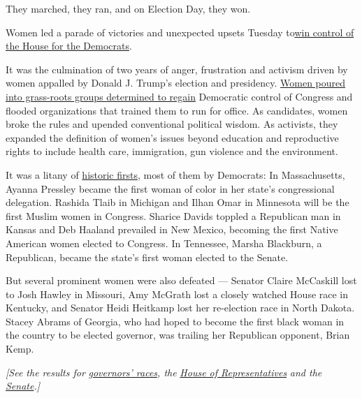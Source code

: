 They marched, they ran, and on Election Day, they won.

Women led a parade of victories and unexpected upsets Tuesday
to\href{https://www.nytimes.com/2018/11/06/us/politics/midterm-elections-results.html}{win
control of the House for the Democrats}.

It was the culmination of two years of anger, frustration and activism
driven by women appalled by Donald J. Trump's election and presidency.
\href{https://www.nytimes.com/2018/11/03/us/politics/women-activism-midterms.html?fbclid=IwAR0HEkwChpr-ouNizi4LoqrMMQC5n5AA1dzZI5uG0Lw8zyTN2DEAMW14wYw}{Women
poured into grass-roots groups determined to regain} Democratic control
of Congress and flooded organizations that trained them to run for
office. As candidates, women broke the rules and upended conventional
political wisdom. As activists, they expanded the definition of women's
issues beyond education and reproductive rights to include health care,
immigration, gun violence and the environment.

It was a litany of
\href{https://www.nytimes.com/2018/11/07/us/politics/election-history-firsts-blackburn-pressley.html}{historic
firsts}, most of them by Democrats: In Massachusetts, Ayanna Pressley
became the first woman of color in her state's congressional delegation.
Rashida Tlaib in Michigan and Ilhan Omar in Minnesota will be the first
Muslim women in Congress. Sharice Davids toppled a Republican man in
Kansas and Deb Haaland prevailed in New Mexico, becoming the first
Native American women elected to Congress. In Tennessee, Marsha
Blackburn, a Republican, became the state's first woman elected to the
Senate.

But several prominent women were also defeated --- Senator Claire
McCaskill lost to Josh Hawley in Missouri, Amy McGrath lost a closely
watched House race in Kentucky, and Senator Heidi Heitkamp lost her
re-election race in North Dakota. Stacey Abrams of Georgia, who had
hoped to become the first black woman in the country to be elected
governor, was trailing her Republican opponent, Brian Kemp.

\emph{{[}See the results for}
\emph{\href{https://www.nytimes.com/interactive/2018/11/06/us/elections/results-governor-elections.html?action=click\&module=Intentional\&pgtype=Article}{governors'
races}, the}
\emph{\href{https://www.nytimes.com/interactive/2018/11/06/us/elections/results-house-elections.html?action=click\&module=Spotlight\&pgtype=Homepage}{House
of Representatives}} \emph{and the}
\emph{\href{https://www.nytimes.com/interactive/2018/11/06/us/elections/results-senate-elections.html}{Senate}.{]}}

